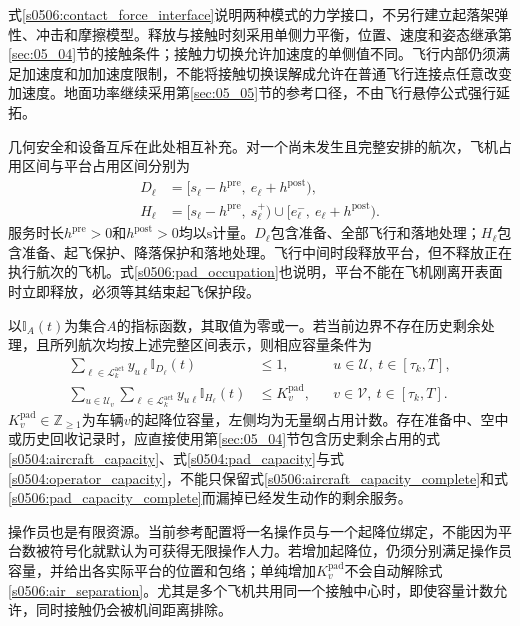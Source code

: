 式\eqref{s0506:contact_force_interface}说明两种模式的力学接口，不另行建立起落架弹性、冲击和摩擦模型。释放与接触时刻采用单侧力平衡，位置、速度和姿态继承第\ref{sec:05_04}节的接触条件；接触力切换允许加速度的单侧值不同。飞行内部仍须满足加速度和加加速度限制，不能将接触切换误解成允许在普通飞行连接点任意改变加速度。地面功率继续采用第\ref{sec:05_05}节的参考口径，不由飞行悬停公式强行延拓。

几何安全和设备互斥在此处相互补充。对一个尚未发生且完整安排的航次，飞机占用区间与平台占用区间分别为
\begin{align}
 D_\ell&=[s_\ell-h^{\mathrm{pre}},\ e_\ell+h^{\mathrm{post}}),
 \label{s0506:aircraft_occupation}\\
 H_\ell&=[s_\ell-h^{\mathrm{pre}},\ s_\ell^+)
       \cup[e_\ell^-,\ e_\ell+h^{\mathrm{post}}).
 \label{s0506:pad_occupation}
\end{align}
服务时长$h^{\mathrm{pre}}>0$和$h^{\mathrm{post}}>0$均以$\mathrm s$计量。$D_\ell$包含准备、全部飞行和落地处理；$H_\ell$包含准备、起飞保护、降落保护和落地处理。飞行中间时段释放平台，但不释放正在执行航次的飞机。式\eqref{s0506:pad_occupation}也说明，平台不能在飞机刚离开表面时立即释放，必须等其结束起飞保护段。

以$\mathbb I_A(t)$为集合$A$的指标函数，其取值为零或一。若当前边界不存在历史剩余处理，且所列航次均按上述完整区间表示，则相应容量条件为
\begin{align}
 \sum_{\ell\in\mathcal L_k^{\mathrm{act}}}
 y_{u\ell}\mathbb I_{D_\ell}(t)&\le1,
 &&u\in\mathcal U,\ t\in[\tau_k,T],
 \label{s0506:aircraft_capacity_complete}\\
 \sum_{u\in\mathcal U_v}
 \sum_{\ell\in\mathcal L_k^{\mathrm{act}}}
 y_{u\ell}\mathbb I_{H_\ell}(t)&\le K_v^{\mathrm{pad}},
 &&v\in\mathcal V,\ t\in[\tau_k,T].
 \label{s0506:pad_capacity_complete}
\end{align}
$K_v^{\mathrm{pad}}\in\mathbb Z_{\ge1}$为车辆$v$的起降位容量，左侧均为无量纲占用计数。存在准备中、空中或历史回收记录时，应直接使用第\ref{sec:05_04}节包含历史剩余占用的式\eqref{s0504:aircraft_capacity}、式\eqref{s0504:pad_capacity}与式\eqref{s0504:operator_capacity}，不能只保留式\eqref{s0506:aircraft_capacity_complete}和式\eqref{s0506:pad_capacity_complete}而漏掉已经发生动作的剩余服务。

操作员也是有限资源。当前参考配置将一名操作员与一个起降位绑定，不能因为平台数被符号化就默认为可获得无限操作人力。若增加起降位，仍须分别满足操作员容量，并给出各实际平台的位置和包络；单纯增加$K_v^{\mathrm{pad}}$不会自动解除式\eqref{s0506:air_separation}。尤其是多个飞机共用同一个接触中心时，即使容量计数允许，同时接触仍会被机间距离排除。

